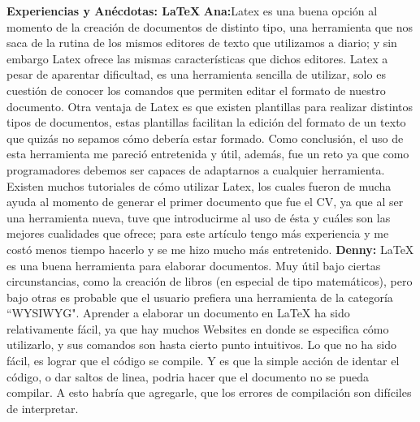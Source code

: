 \documentclass[12pt]{report}
\begin{document}
	\begingroup
		\large{
			\textbf{
				Experiencias y Anécdotas: LaTeX
				\newline
				\newline
			}
		}
	\endgroup
	\textbf{Ana:\newline\newline}Latex es una buena opción al momento de la creación de documentos de distinto tipo, una herramienta que nos saca de la rutina de los mismos editores de texto que utilizamos a diario; y sin embargo Latex ofrece las mismas características que dichos editores.
\newline	
\newline	
Latex  a pesar de aparentar dificultad, es una herramienta sencilla de utilizar, solo es cuestión de conocer los comandos que permiten editar el formato de nuestro documento.
Otra ventaja de Latex es que existen plantillas para realizar distintos tipos de documentos, estas plantillas facilitan la edición del formato de un texto que quizás no sepamos cómo debería estar formado.
\newline	
\newline	
Como conclusión, el uso de esta herramienta me pareció entretenida y útil, además, fue un reto ya que como programadores debemos ser capaces de adaptarnos a cualquier herramienta.
\newline
\newline		
Existen muchos tutoriales de cómo utilizar Latex, los cuales fueron de mucha ayuda al momento de generar el primer documento que fue el CV, ya que al ser una herramienta nueva, tuve que introducirme al uso de ésta y cuáles son las mejores cualidades que ofrece; para este artículo tengo más experiencia y me costó menos tiempo hacerlo y se me hizo mucho más entretenido.
\newline
\newline	
\textbf{Denny:\newline\newline} LaTeX es una buena herramienta para elaborar documentos. Muy útil bajo ciertas circunstancias, como la creación de libros (en especial de tipo matemáticos), pero bajo otras es probable que el usuario prefiera una herramienta de la categoría ``WYSIWYG".
\newline
\newline
Aprender a elaborar un documento en LaTeX ha sido relativamente fácil, ya que hay muchos Websites en donde se especifica cómo utilizarlo, y sus comandos son hasta cierto punto intuitivos. Lo que no ha sido fácil, es lograr que el código se compile. Y es que la simple acción de identar el código, o dar saltos de linea,  podria hacer que el documento no se pueda compilar. A esto habría que agregarle, que los errores de compilación son difíciles de interpretar. 
\end{document}
